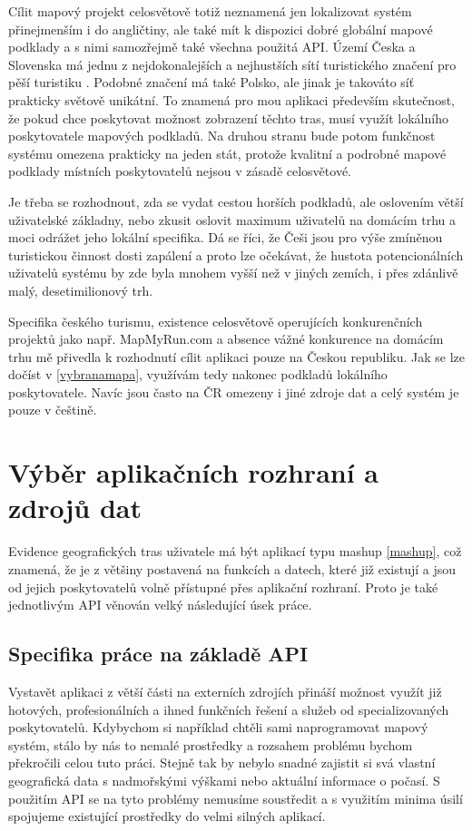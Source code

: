 Cílit mapový projekt celosvětově totiž neznamená jen lokalizovat
systém přinejmenším i do angličtiny, ale také mít k dispozici dobré
globální mapové podklady a s nimi samozřejmě také všechna použitá
API. Území Česka a Slovenska má jednu z nejdokonalejších a nejhustších
sítí turistického značení pro pěší turistiku \cite{kct}.
Podobné značení má také Polsko, ale jinak je takováto síť prakticky světově unikátní. To
znamená pro mou aplikaci především skutečnost, že pokud chce
poskytovat možnost zobrazení těchto tras, musí využít lokálního
poskytovatele mapových podkladů. Na druhou stranu bude potom
funkčnost systému omezena prakticky na jeden stát, protože kvalitní a
podrobné mapové podklady místních poskytovatelů nejsou v zásadě celosvětové.

Je třeba se rozhodnout, zda se vydat cestou horších podkladů, ale
oslovením větší uživatelské základny, nebo zkusit oslovit maximum
uživatelů na domácím trhu a moci odrážet jeho lokální specifika. Dá se
říci, že Češi jsou pro výše zmíněnou turistickou činnost dosti
zapálení \cite{turistika} a proto lze očekávat, že hustota
potencionálních uživatelů systému by zde byla mnohem vyšší než v jiných zemích, i přes zdánlivě
malý, desetimilionový trh.

Specifika českého turismu, existence celosvětově operujících
konkurenčních projektů jako např. MapMyRun.com a absence vážné
konkurence na domácím trhu mě přivedla k rozhodnutí cílit aplikaci
pouze na Českou republiku. Jak se lze dočíst v \ref{vybranamapa},
využívám tedy nakonec podkladů lokálního poskytovatele. Navíc jsou
často na ČR omezeny i jiné zdroje dat a celý systém je pouze v
češtině.

\chapter{Výběr aplikačních rozhraní a zdrojů dat}
Evidence geografických tras uživatele má být aplikací typu mashup
\ref{mashup}, což znamená, že je z většiny postavená na funkcích a
datech, které již existují a jsou od jejich poskytovatelů volně
přístupné přes aplikační rozhraní. Proto je také jednotlivým
API věnován velký následující úsek práce.

\section{Specifika práce na základě API}
Vystavět aplikaci z větší části na externích zdrojích přináší možnost
využít již hotových, profesionálních a ihned funkčních řešení a služeb
od specializovaných poskytovatelů. Kdybychom si například chtěli sami
naprogramovat mapový systém, stálo by nás to nemalé prostředky a
rozsahem problému bychom překročili celou tuto práci. Stejně tak by
nebylo snadné zajistit si svá vlastní geografická data s nadmořskými
výškami nebo aktuální informace o počasí. S použitím API se na tyto
problémy nemusíme soustředit a s využitím minima úsilí spojujeme
existující prostředky do velmi silných aplikací.

